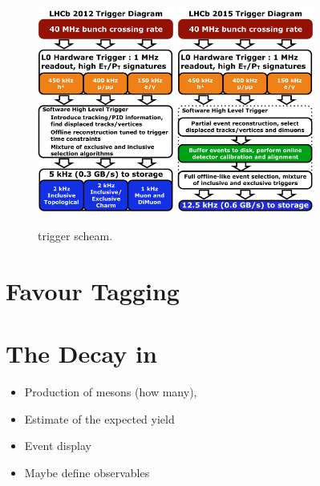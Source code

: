 \begin{figure}[t]
  \centering
  \includegraphics[width=0.4\textwidth]{Figures/Chapter2/LHCb_Trigger_RunIAlgDetail_May2015}
  \includegraphics[width=0.4\textwidth]{Figures/Chapter2/LHCb_Trigger_RunII_May2015}
  \caption{\runone trigger scheam.}
  \label{run_one_trigger}
\end{figure}


\section{Favour Tagging}
\label{det_tagging}

\section{The \BJpsiKst Decay in \lhcb}
\label{BspsiKst_at_lhcb}
\begin{itemize}
  \item Production of \Bs mesons (how many),
  \item Estimate of the expected yield
  \item Event display
  \item Maybe define observables
\end{itemize}
